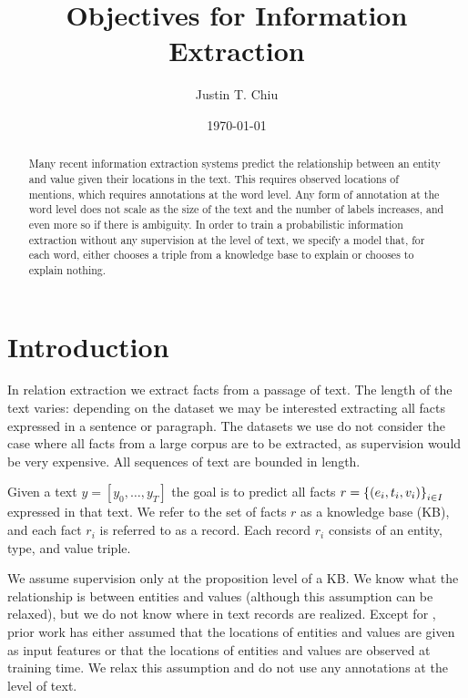 \documentclass[12pt]{article}
\title{Objectives for Information Extraction}
\author{
Justin T. Chiu
}
\date{\today}
\begin{document}
\maketitle

\begin{abstract}
Many recent information extraction systems predict the relationship between an entity and value given
their locations in the text.
This requires observed locations of mentions, which requires annotations at the word level.
Any form of annotation at the word level does not scale as the size of the text
and the number of labels increases, and even more so if there is ambiguity.
In order to train a probabilistic information extraction without any
supervision at the level of text, we specify a model 
that, for each word, either chooses a triple from a knowledge base to explain
or chooses to explain nothing.
\end{abstract}

\section{Introduction}

In relation extraction we extract facts from a passage of text.
The length of the text varies: depending on the dataset we may be interested extracting
all facts expressed in a sentence or paragraph.
The datasets we use do not consider the case where all facts from a large corpus are to be extracted,
as supervision would be very expensive.
All sequences of text are bounded in length.

Given a text $y = [y_0, \ldots, y_T]$ the goal is to predict all facts
$r = \left\{(e_i, t_i, v_i)\right\}_{i \in I}$ expressed in that text.
We refer to the set of facts $r$ as a knowledge base (KB),
and each fact $r_i$ is referred to as a record.
Each record $r_i$ consists of an entity, type, and value triple. 

We assume supervision only at the proposition level of a KB.
We know what the relationship is between entities and values
(although this assumption can be relaxed),
but we do not know where in text records are realized.
Except for \citet{zeng2018copy}, prior work has either assumed that the locations of
entities and values are given as input features or that the locations of entities and values
are observed at training time.
We relax this assumption and do not use any annotations at the level of text.
\end{document}
